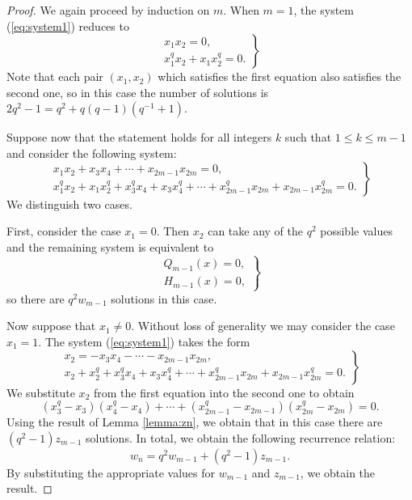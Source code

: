 	\begin{proof}
		We again proceed by induction on $m$. When $m=1$, the system (\ref{eq:system1}) reduces to
		\begin{equation*}
			\left.
				\begin{array}{l}
					x_1 x_2 = 0, \\
					x_1^q x_2 + x_1 x_2^q = 0.
				\end{array}
			\right\}
		\end{equation*}
		Note that each pair $(x_1,x_2)$ which satisfies the first equation also satisfies the second
		one, so in this case the number of solutions is $2q^2-1 = q^2 + q(q-1)(q^{-1}+1)$.

		Suppose now that the statement holds for all integers $k$ such that
		$1 \leqslant k \leqslant m-1$ and consider the following system:
		\begin{equation*}
			\left.
				\begin{array}{l}
					x_1 x_2 + x_3 x_4 + \cdots + x_{2m-1} x_{2m} = 0, \\
					x_1^q x_2 + x_1 x_2^q + x_3^q x_4 + x_3 x_4^q + \cdots + x_{2m-1}^q x_{2m}
				+ x_{2m-1} x_{2m}^q = 0.
				\end{array}
			\right\}
		\end{equation*}
		We distinguish two cases.

		First, consider the case $x_1 = 0$. Then $x_2$ can take any of the $q^2$ possible values
		and the remaining system is equivalent to
		\begin{equation*}
			\left.
				\begin{array}{l}
					Q_{m-1}(x) = 0, \\
					H_{m-1}(x) = 0,
				\end{array}
			\right\}
		\end{equation*}
		so there are $q^2 w_{m-1}$ solutions in this case.

		Now suppose that $x_1 \neq 0$. Without loss of generality we may consider the case $x_1=1$.
		The system (\ref{eq:system1}) takes the form
		\begin{equation*}
			\left.
				\begin{array}{l}
					x_2 = - x_3 x_4 - \cdots - x_{2m-1} x_{2m}, \\
					x_2 + x_2^q + x_3^q x_4 + x_3 x_4^q + \cdots + x_{2m-1}^q x_{2m}
				+ x_{2m-1} x_{2m}^q = 0.
				\end{array}
			\right\}
		\end{equation*}
		We substitute $x_2$ from the first equation into the second one to obtain
		\begin{equation*}
			(x_3^q-x_3)(x_4^q-x_4) + \cdots + (x_{2m-1}^q-x_{2m-1})(x_{2m}^q-x_{2m}) = 0.
		\end{equation*}
		Using the result of Lemma \ref{lemma:zn}, we obtain that in this case there are
		$(q^2-1)z_{m-1}$ solutions. In total, we obtain the following recurrence relation:
		\begin{equation*}
			w_n = q^2 w_{m-1} + (q^2-1) z_{m-1}.
		\end{equation*}
		By substituting the appropriate values for $w_{m-1}$ and $z_{m-1}$, we obtain the result.
	\end{proof}

